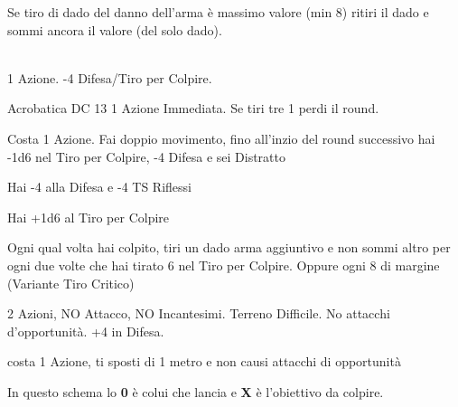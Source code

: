 \documentclass[landscape,10pt,a4paper]{article}
\begin{document}
\begin{multicols}{3}
\begin{dmbox}[title=Esplosione del Danno - pagina \pageref{esplosionedeldanno}]
Se tiro di dado del danno dell'arma è massimo valore (min 8) ritiri il dado e sommi ancora il valore (del solo dado).
\end{dmbox}

\begin{dmbox}[title=Alzarsi da prono - pagina \pageref{alzarsidaprono}]
\textbf{}\\
1 Azione. -4 Difesa/Tiro per Colpire.

Acrobatica DC 13 1 Azione Immediata. Se tiri tre 1 perdi il round. 
\end{dmbox}



\begin{dmbox}[title=Azione di Scatto - pagina \pageref{azionediscatto}]
Costa 1 Azione. Fai doppio movimento, fino all'inzio del round successivo hai -1d6 nel Tiro per Colpire, -4 Difesa e sei Distratto
\end{dmbox}

\begin{dmbox}[title=Difesa da Sorpresi - pagina \pageref{difesasorpresi}]
Hai -4 alla Difesa e -4 TS Riflessi
\end{dmbox}

\begin{dmbox}[title=Attacco a Tocco - pagina \pageref{difesaatocco}]
Hai +1d6 al Tiro per Colpire
\end{dmbox}

\begin{dmbox}[title=Tiro Critico - pagina \pageref{tirocritico}]
Ogni qual volta hai colpito, tiri un dado arma aggiuntivo e non sommi altro per ogni due volte che hai tirato 6 nel Tiro per Colpire. Oppure ogni 8 di margine (Variante Tiro Critico)
\end{dmbox}

\begin{dmbox}[title=Difesa Totale - pagina \pageref{difesatotale}]
2 Azioni, NO Attacco, NO Incantesimi. Terreno Difficile. No attacchi d'opportunità. +4 in Difesa.
\end{dmbox}

\begin{dmbox}[title=Disingaggiare - pagina \pageref{disingaggiare}]
costa 1 Azione, ti sposti di 1 metro e non causi attacchi di opportunità
\end{dmbox}

\begin{dmbox}[title=Armi a spargimento - pagina \pageref{attacchiarmidaspargimento}]
In questo schema lo \textbf{0} è colui che lancia e \textbf{X} è l'obiettivo da colpire.\\


\end{dmbox}
\end{multicols}
\end{document}
